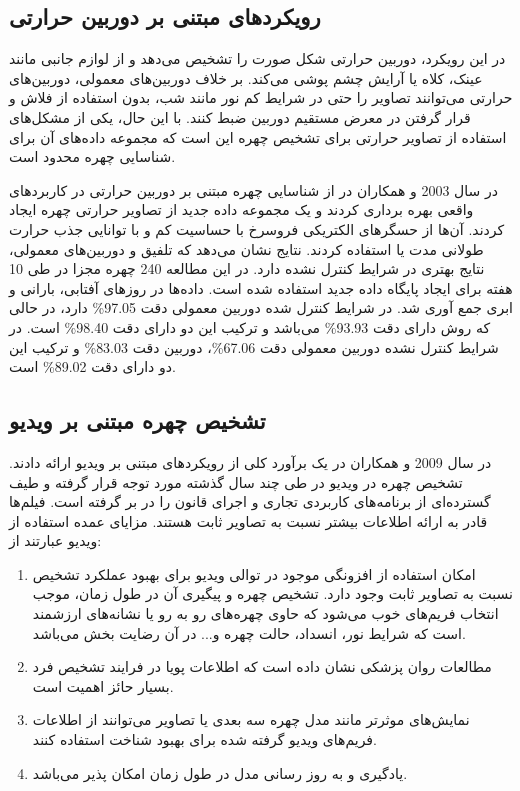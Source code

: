 \subsection{رویکرد‌های مبتنی بر دوربین حرارتی}
در این رویکرد، دوربین حرارتی شکل صورت را تشخیص می‌دهد و از لوازم جانبی مانند عینک، کلاه یا آرایش چشم پوشی می‌کند. بر خلاف دوربین‌های معمولی، دوربین‌های حرارتی می‌توانند تصاویر را حتی در شرایط کم نور مانند شب، بدون استفاده از فلاش و قرار گرفتن در معرض مستقیم دوربین ضبط کنند. با این حال، یکی از مشکل‌های استفاده از تصاویر حرارتی برای تشخیص چهره این است که مجموعه داده‌های آن برای شناسایی چهره محدود است.

\noindent
در سال 2003  و همکاران در \cite{SOCOLINSKY200372} از شناسایی چهره مبتنی بر دوربین حرارتی در کاربردهای واقعی بهره برداری کردند و یک مجموعه داده جدید از تصاویر حرارتی چهره ایجاد کردند. آن‌ها از حسگرهای الکتریکی فروسرخ با حساسیت کم و با توانایی جذب حرارت طولانی مدت یا   استفاده کردند. نتایج نشان می‌دهد که تلفیق  و دوربین‌های معمولی، نتایج بهتری در شرایط کنترل نشده دارد. در این مطالعه 240 چهره مجزا در طی 10 هفته برای ایجاد پایگاه داده جدید استفاده شده است. داده‌ها در روزهای آفتابی، بارانی و ابری جمع آوری شد. در شرایط کنترل شده دوربین معمولی دقت 97.05\% دارد، در حالی که روش  دارای دقت 93.93\% می‌باشد و ترکیب این دو دارای دقت 98.40\% است. در شرایط کنترل نشده دوربین معمولی دقت 67.06\%، دوربین  دقت 83.03\% و ترکیب این دو دارای دقت 89.02\% است.

\subsection{تشخیص چهره مبتنی بر ویدیو}
در سال 2009  و همکاران در \cite{wang2009video} یک برآورد کلی از رویکردهای مبتنی بر ویدیو ارائه دادند. تشخیص چهره در ویدیو در طی چند سال گذشته مورد توجه قرار گرفته و طیف گسترده‌ای از برنامه‌های کاربردی تجاری و اجرای قانون را در بر گرفته است. فیلم‌ها قادر به ارائه اطلاعات بیشتر نسبت به تصاویر ثابت هستند. مزایای عمده استفاده از ویدیو عبارتند از:

\begin{enumerate}
\item
	امکان استفاده از افزونگی موجود در توالی ویدیو برای بهبود عملکرد تشخیص نسبت به تصاویر ثابت وجود دارد. تشخیص چهره و پیگیری آن در طول زمان، موجب انتخاب فریم‌های خوب می‌شود که حاوی چهره‌های رو به رو یا نشانه‌های ارزشمند است که شرایط نور، انسداد، حالت چهره و... در آن رضایت بخش می‌باشد.
\item 
	مطالعات روان پزشکی نشان داده است که اطلاعات پویا در فرایند تشخیص فرد بسیار حائز اهمیت است. 
\item
	نمایش‌های موثرتر مانند مدل چهره سه بعدی یا تصاویر  می‌توانند از اطلاعات فریم‌های ویدیو گرفته شده برای بهبود شناخت استفاده کنند.
\item
	یادگیری و به روز رسانی مدل در طول زمان امکان پذیر می‌باشد.
\end{enumerate}
	
